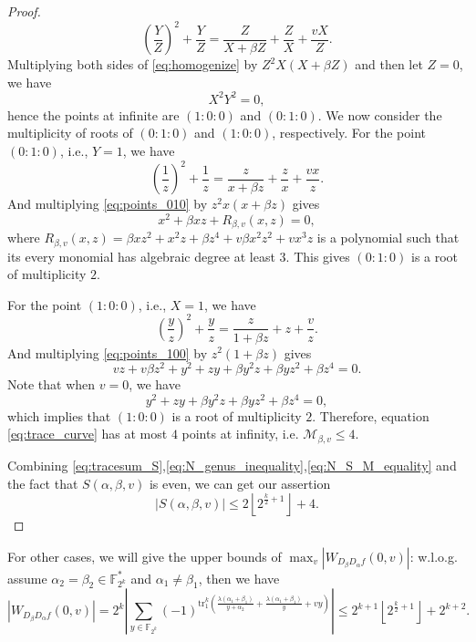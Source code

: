 \documentclass[8pt,oneside]{article}
\newcommand{\0}{\textbf{0}}
\newcommand{\1}{\textbf{1}}
\newcommand{\tr}{\mathrm{tr}_1^k}
\newcommand{\F}{\mathbb{F}}
\newtheorem{proof}{Proof}
\begin{document}
\begin{proof}
\begin{equation}
            \left( \frac{Y}{Z} \right)^2+\frac{Y}{Z}=\frac{Z}{X+\beta Z}+\frac{Z}{X}+\frac{vX}{Z}.
        \end{equation}
        Multiplying both sides of \eqref{eq:homogenize} by $ Z^2X\left( X+\beta Z \right) $ and then let $ Z=0 $, 
        we have 
        \[X^2Y^2=0,\]
        hence the points at infinite are $ (1:0:0) $ and $ (0:1:0) $. 
        We now consider the multiplicity of roots of $ (0 : 1 : 0) $ and $ (1 : 0 : 0) $, respectively. 
        For the point $ (0 : 1 : 0 ) $, i.e., $ Y = 1 $, we have
        \begin{equation}\label{eq:points_010}
            \left( \frac{1}{z} \right)^2+\frac{1}{z}=\frac{z}{x+\beta z}+\frac{z}{x}+\frac{vx}{z}.
        \end{equation}
        And multiplying \eqref{eq:points_010} by $ z^2x(x+\beta z) $ gives 
        \[x^2+\beta xz+R_{\beta,v}(x,z)=0,\]
        where $ R_{\beta,v}(x,z)=\beta xz^2+x^2z+\beta z^4+v\beta x^2z^2+vx^3z $ is a polynomial 
        such that its every monomial has algebraic degree at least $ 3 $. 
        This gives $ (0 : 1 : 0) $ is a root of multiplicity $ 2 $. 
        
        For the point $ (1 : 0 : 0) $, i.e., $ X = 1 $, we have
        \begin{equation}\label{eq:points_100}
            \left( \frac{y}{z} \right)^2+\frac{y}{z}=\frac{z}{1+\beta z}+z+\frac{v}{z}.
        \end{equation}
        And multiplying \eqref{eq:points_100} by $ z^2(1+\beta z) $ gives 
        \[vz+v\beta z^2+y^2+zy+\beta y^2z+\beta yz^2+\beta z^4=0.\]
        Note that when $ v=0 $, we have 
        \[y^2+zy+\beta y^2z+\beta yz^2+\beta z^4=0,\]
        which implies that $ (1:0:0) $ is a root of multiplicity $ 2 $. 
        Therefore, equation \eqref{eq:trace_curve} has at most $ 4 $ points at infinity, i.e. 
        $ \mathcal{M}_{\beta,v}\le4 $. 

        Combining \eqref{eq:tracesum_S},\eqref{eq:N_genus_inequality},\eqref{eq:N_S_M_equality} and the fact that 
        $ S(\alpha,\beta,v) $ is even, we can get our assertion
        \[\left\lvert S(\alpha,\beta,v)\right\rvert \le 2\left\lfloor 2^{\frac{k}{2}+1}\right\rfloor+4.\]
    \end{proof}
    
    For other cases, we will give the upper bounds of $ \max_{v}|W_{D_{\beta}D_{\alpha}f}(0,v)| $: 
    w.l.o.g. assume $ \alpha_2=\beta_2\in\F_{2^k}^* $ and $ \alpha_1\ne\beta_1 $, then we have 
    \[\left\lvert W_{D_{\beta}D_{\alpha}f}(0,v)\right\rvert =2^k\left\lvert \sum_{y\in\F_{2^k}}(-1)^{\tr\left(\frac{\lambda(\alpha_1+\beta_1)}{y+\alpha_2}+\frac{\lambda(\alpha_1+\beta_1)}{y}+vy\right)}\right\rvert\le 2^{k+1}\left\lfloor 2^{\frac{k}{2}+1}\right\rfloor+2^{k+2}.\]



    


\end{document}
